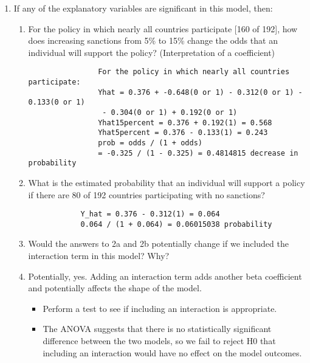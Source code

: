 \documentclass[12pt,letterpaper]{article}
\begin{document}
\begin{enumerate}
\begin{enumerate}
	\end{enumerate}
	
	\item
	If any of the explanatory variables are significant in this model, then:
	\begin{enumerate}
		\item
		For the policy in which nearly all countries participate [160 of 192], how does increasing sanctions from 5\% to 15\% change the odds that an individual will support the policy? (Interpretation of a coefficient)
			\begin{verbatim}
				For the policy in which nearly all countries participate:
				Yhat = 0.376 + -0.648(0 or 1) - 0.312(0 or 1) - 0.133(0 or 1)
				 - 0.304(0 or 1) + 0.192(0 or 1) 
				Yhat15percent = 0.376 + 0.192(1) = 0.568
				Yhat5percent = 0.376 - 0.133(1) = 0.243
				prob = odds / (1 + odds)
				= -0.325 / (1 - 0.325) = 0.4814815 decrease in probability
			\end{verbatim} 
		\item
		What is the estimated probability that an individual will support a policy if there are 80 of 192 countries participating with no sanctions? 
		\begin{verbatim}
			Y_hat = 0.376 - 0.312(1) = 0.064
			0.064 / (1 + 0.064) = 0.06015038 probability 
		\end{verbatim}
		\item
		Would the answers to 2a and 2b potentially change if we included the interaction term in this model? Why? 
			\item[] Potentially, yes. Adding an interaction term adds another beta coefficient and potentially affects the shape of the model. 
		\begin{itemize}
			\item Perform a test to see if including an interaction is appropriate.
			
			\item[] The ANOVA suggests that there is no statistically significant difference between the two models, so we fail to reject H0 that including an interaction would have no effect on the model outcomes. 
		\end{itemize}
	\end{enumerate}
	\end{enumerate}
\end{document}
